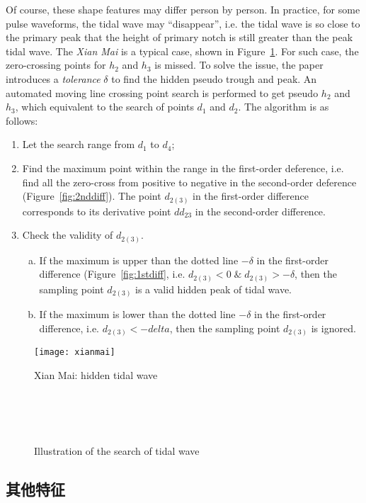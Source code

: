 Of course, these shape features may differ person by person. In
practice, for some pulse waveforms, the tidal wave may ``disappear'',
i.e. the tidal wave is so close to the primary peak that the height of
primary notch is still greater than the peak tidal wave. The
\emph{Xian Mai} is a typical case, shown in Figure~\ref{fig:xianmai}.
For such case, the zero-crossing points for $h_2$ and $h_3$ is missed.
To solve the issue, the paper introduces a \emph{tolerance} $\delta$ to find
the hidden pseudo trough and peak. An automated moving line
crossing point search is performed to get pseudo $h_2$ and $h_3$, which
equivalent to the search of points $d_1$ and $d_2$. The algorithm is
as follows:
\begin{enumerate}[(1)]
    \item Let the search range from $d_1$ to $d_4$;
    \item Find the maximum point within the range in the first-order
        deference, i.e. find all the
        zero-cross from positive to negative in the second-order
        deference (Figure~\ref{fig:2nddiff}). The point $d_{2(3)}$ in
        the first-order difference corresponds to its derivative point
        $dd_23$ in the second-order difference. 
    \item Check the validity of $d_{2(3)}$. 
        \begin{enumerate}[a)]
            \item If the maximum is upper than the dotted line
                $-\delta$ in the first-order difference
                (Figure~\ref{fig:1stdiff}, i.e. $d_{2(3)}<0 \; \& \;
                d_{2(3)} > -\delta$, then the sampling point $d_{2(3)}$ is a valid
                hidden peak of tidal wave.
            \item If the maximum is lower than the dotted line
                $-\delta$ in the first-order difference, i.e.
                $d_{2(3)}<-delta$, then the sampling point
                $d_{2(3)}$ is ignored.
        \end{enumerate}
\end{enumerate}

\begin{figure}[htbp]
    \begin{center}
        \texttt{[image: xianmai]}
    \end{center}
    \caption{Xian Mai: hidden tidal wave}
    \label{fig:xianmai}
\end{figure}

\begin{figure}
    \centering
    \\
    \\
    \\
    \caption{Illustration of the search of tidal wave}
    \label{fig:hiddentidal}
\end{figure}


\subsection{其他特征}

